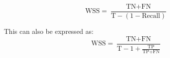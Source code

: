 \documentclass[../main.tex]{subfiles}
\begin{document}
\begin{equation}
\text{WSS} = \frac{\text{TN} + \text{FN}}{\text{T} - (1 - \text{Recall})}
\end{equation}

This can also be expressed as:
\begin{equation}
\text{WSS} = \frac{\text{TN} + \text{FN}}{\text{T} - 1 + \frac{\text{TP}}{\text{TP} + \text{FN}}}
\end{equation}
\end{document}
